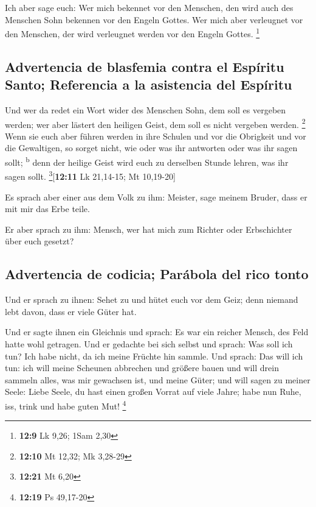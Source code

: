  Ich aber sage euch: Wer mich bekennet vor den Menschen,
den wird auch des Menschen Sohn bekennen vor den Engeln Gottes.
 Wer mich aber verleugnet vor den Menschen, der wird
verleugnet werden vor den Engeln Gottes. \footnote{\textbf{12:9} Lk
  9,26; 1Sam 2,30}

\hypertarget{advertencia-de-blasfemia-contra-el-espuxedritu-santo-referencia-a-la-asistencia-del-espuxedritu}{%
\subsection{Advertencia de blasfemia contra el Espíritu Santo;
Referencia a la asistencia del
Espíritu}\label{advertencia-de-blasfemia-contra-el-espuxedritu-santo-referencia-a-la-asistencia-del-espuxedritu}}

 Und wer da redet ein Wort wider des Menschen Sohn, dem
soll es vergeben werden; wer aber lästert den heiligen Geist, dem soll
es nicht vergeben werden. \footnote{\textbf{12:10} Mt 12,32; Mk 3,28-29}
 Wenn sie euch aber führen werden in ihre Schulen und vor
die Obrigkeit und vor die Gewaltigen, so sorget nicht, wie oder was ihr
antworten oder was ihr sagen sollt; \textsuperscript{b} 
denn der heilige Geist wird euch zu derselben Stunde lehren, was ihr
sagen sollt. \footnote{\textbf{12:21} Mt 6,20}{[}\textbf{12:11} Lk
21,14-15; Mt 10,19-20{]}

 Es sprach aber einer aus dem Volk zu ihm: Meister, sage
meinem Bruder, dass er mit mir das Erbe teile.

 Er aber sprach zu ihm: Mensch, wer hat mich zum Richter
oder Erbschichter über euch gesetzt?

\hypertarget{advertencia-de-codicia-paruxe1bola-del-rico-tonto}{%
\subsection{Advertencia de codicia; Parábola del rico
tonto}\label{advertencia-de-codicia-paruxe1bola-del-rico-tonto}}

 Und er sprach zu ihnen: Sehet zu und hütet euch vor dem
Geiz; denn niemand lebt davon, dass er viele Güter hat.

 Und er sagte ihnen ein Gleichnis und sprach: Es war ein
reicher Mensch, des Feld hatte wohl getragen.  Und er
gedachte bei sich selbst und sprach: Was soll ich tun? Ich habe nicht,
da ich meine Früchte hin sammle.  Und sprach: Das will
ich tun: ich will meine Scheunen abbrechen und größere bauen und will
drein sammeln alles, was mir gewachsen ist, und meine Güter;
 und will sagen zu meiner Seele: Liebe Seele, du hast
einen großen Vorrat auf viele Jahre; habe nun Ruhe, iss, trink und habe
guten Mut! \footnote{\textbf{12:19} Ps 49,17-20}

